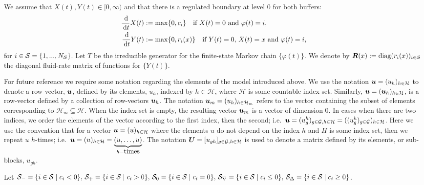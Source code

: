 We assume that $X(t), Y(t) \in [0,\infty)$ and that there is a regulated boundary at level $0$ for both buffers: 
% 
	\begin{align*} 
		\frac{\, \mathrm{d}}{\, \mathrm{d} t} X(t) & := \max\{0, c_i\} \quad \mbox{if } X(t) = 0 \mbox{ and } \varphi(t) = i, \\
          	\frac{\, \mathrm{d}}{\, \mathrm{d} t} Y(t) & := \max\{0, r_i(x)\} \quad \mbox{if } Y(t) = 0,\,X(t) = x \mbox{ and } \varphi(t) = i, 	
	\end{align*} 
for $i \in \mathcal{S} = \{1,...,N_{\mathcal{S}}\}$. Let $T$ be the irreducible generator for the finite-state Markov chain $\{\varphi(t)\}$. 
We denote by $\boldsymbol R(x) := \mathrm{diag}(r_i(x))_{i \in \mathcal{S}}$ the diagonal fluid-rate matrix of functions for $\{Y(t)\}$. 

\begin{rem}[Notation]\label{remark: notation 1}For future reference we require some notation regarding the elements of the model introduced above. We use the notation \(\boldsymbol u = (u_h)_{h\in \mathcal H}\) to denote a row-vector, \(\boldsymbol u\), defined by its elements, \(u_h\), indexed by \(h\in\mathcal H\), where \(\mathcal H\) is some countable index set. Similarly, \(\boldsymbol u = (\boldsymbol u_h)_{h\in\mathcal H}\), is a row-vector defined by a collection of row-vectors \(\boldsymbol u_h\). The notation \(\boldsymbol u_m=(u_h)_{h\in\mathcal H_m}\) refers to the vector containing the subset of elements corresponding to \(\mathcal H_m\subseteq \mathcal H\). When the index set is empty, the resulting vector \(\boldsymbol u_m\) is a vector of dimension 0. In cases when there are two indices, we order the elements of the vector according to the first index, then the second; i.e.~\(\boldsymbol u = (u_{g}^h)_{g\in\mathcal G,h\in\mathcal H} = ((u_g^h)_{g\in\mathcal G})_{h\in\mathcal H}\). Here we use the convention that for a vector \(\boldsymbol u=(u)_{h\in \mathcal H}\) where the elements \(u\) do not depend on the index \(h\) and \(H\) is some index set, then we repeat \(u\) \(h\)-times; i.e.~\(\boldsymbol u = (u)_{h\in \mathcal H} =\underbrace{(u,\dots,u)}_{h-\mbox{times}}\). The notation \(\boldsymbol U = [u_{gh}]_{g\in\mathcal G, h\in\mathcal H}\) is used to denote a matrix defined by its elements, or sub-blocks, \(u_{gh}\). 
\end{rem}

Let \(\mathcal S_-=\{i\in\mathcal{S}\mid c_i<0\},\, \mathcal S_+=\{i\in\mathcal{S}\mid c_i>0\},\, \mathcal S_0=\{i\in\mathcal{S}\mid c_i=0\},\, \mathcal S_\nabla=\{i\in\mathcal{S}\mid c_i\leq0\},\, \mathcal S_\Delta=\{i\in\mathcal{S}\mid c_i\geq0\}\). 

